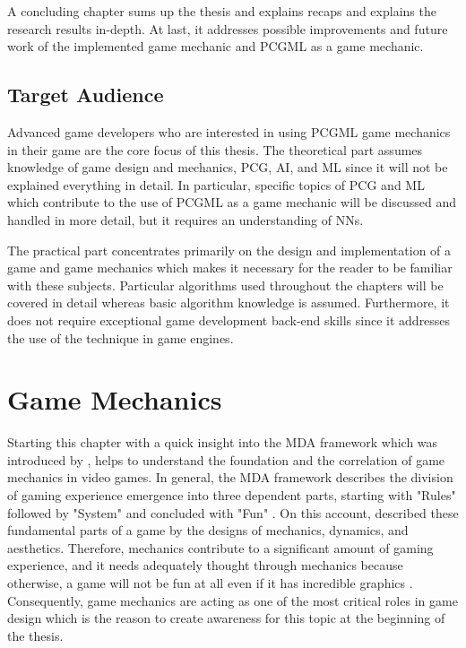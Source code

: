 \documentclass[MGS,Master,english]{twbook}%
\begin{document}
A concluding chapter sums up the thesis and explains recaps and explains the research results in-depth. At last, it addresses possible improvements and future work of the implemented game mechanic and PCGML as a game mechanic.

\section{Target Audience}
Advanced game developers who are interested in using PCGML game mechanics in their game are the core focus of this thesis. The theoretical part assumes knowledge of game design and mechanics, PCG, \ac{AI}, and ML since it will not be explained everything in detail. In particular, specific topics of PCG and ML which contribute to the use of PCGML as a game mechanic will be discussed and handled in more detail, but it requires an understanding of \acp{NN}.

The practical part concentrates primarily on the design and implementation of a game and game mechanics which makes it necessary for the reader to be familiar with these subjects. Particular algorithms used throughout the chapters will be covered in detail whereas basic algorithm knowledge is assumed. Furthermore, it does not require exceptional game development back-end skills since it addresses the use of the technique in game engines.

%
%
\clearpage
\chapter{Game Mechanics} \label{gameMechanicsChapter}
Starting this chapter with a quick insight into the \ac{MDA} framework which was introduced by \citep{mechanic::MDA}, helps to understand the foundation and the correlation of game mechanics in video games. In general, the MDA framework describes the division of gaming experience emergence into three dependent parts, starting with "Rules" followed by "System" and concluded with "Fun" \cite{mechanic::MDA}.  On this account, \citep{mechanic::MDA} described these fundamental parts of a game by the designs of mechanics, dynamics, and aesthetics. Therefore, mechanics contribute to a significant amount of gaming experience, and it needs adequately thought through mechanics because otherwise, a game will not be fun at all even if it has incredible graphics \cite{gameDesign::gameMechanicsAdvancedGameDesign}. Consequently, game mechanics are acting as one of the most critical roles in game design which is the reason to create awareness for this topic at the beginning of the thesis.
\end{document}
